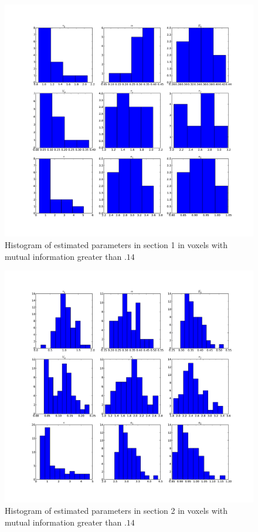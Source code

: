 \begin{figure} %
\centering
\includegraphics[clip=true,trim=2.5cm 2cm 2cm 1cm,width=15cm]{images/slicesim_hist1}
\caption{Histogram of estimated parameters in section 1 in voxels with mutual information greater
than $.14$}
\label{fig:slicesim_hist1}
\end{figure}

\begin{figure} %
\centering
\includegraphics[clip=true,trim=2.5cm 2cm 2cm 1cm,width=15cm]{images/slicesim_hist2}
\caption{Histogram of estimated parameters in section 2 in voxels with mutual information greater
than $.14$}
\label{fig:slicesim_hist2}
\end{figure}

